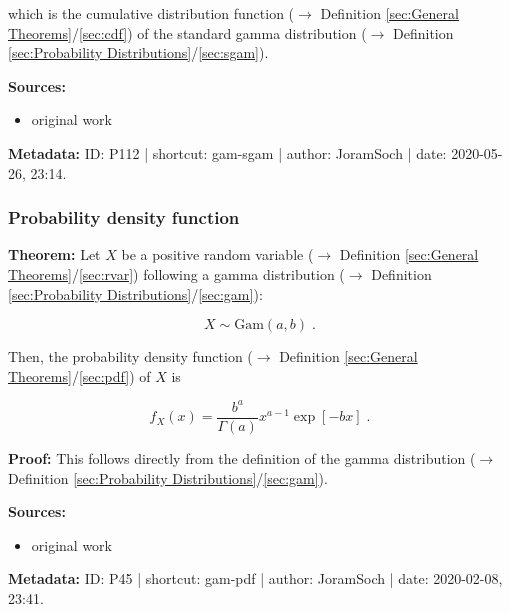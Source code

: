 \documentclass[a4paper,12pt,twoside]{book}
\begin{document}
which is the cumulative distribution function ($\rightarrow$ Definition \ref{sec:General Theorems}/\ref{sec:cdf}) of the standard gamma distribution ($\rightarrow$ Definition \ref{sec:Probability Distributions}/\ref{sec:sgam}).


\vspace{1em}
\textbf{Sources:}
\begin{itemize}
\item original work\end{itemize}


\vspace{1em}
\textbf{Metadata:} ID: P112 | shortcut: gam-sgam | author: JoramSoch | date: 2020-05-26, 23:14.
\vspace{1em}



\subsubsection[\textbf{Probability density function}]{Probability density function} \label{sec:gam-pdf}
\setcounter{equation}{0}

\textbf{Theorem:} Let $X$ be a positive random variable ($\rightarrow$ Definition \ref{sec:General Theorems}/\ref{sec:rvar}) following a gamma distribution ($\rightarrow$ Definition \ref{sec:Probability Distributions}/\ref{sec:gam}):

\begin{equation} \label{eq:gam-pdf-gam}
X \sim \mathrm{Gam}(a, b) \; .
\end{equation}

Then, the probability density function ($\rightarrow$ Definition \ref{sec:General Theorems}/\ref{sec:pdf}) of $X$ is

\begin{equation} \label{eq:gam-pdf-gam-pdf}
f_X(x) = \frac{b^a}{\Gamma(a)} x^{a-1} \exp[-b x] \; .
\end{equation}


\vspace{1em}
\textbf{Proof:} This follows directly from the definition of the gamma distribution ($\rightarrow$ Definition \ref{sec:Probability Distributions}/\ref{sec:gam}).


\vspace{1em}
\textbf{Sources:}
\begin{itemize}
\item original work\end{itemize}


\vspace{1em}
\textbf{Metadata:} ID: P45 | shortcut: gam-pdf | author: JoramSoch | date: 2020-02-08, 23:41.
\vspace{1em}
\end{document}
